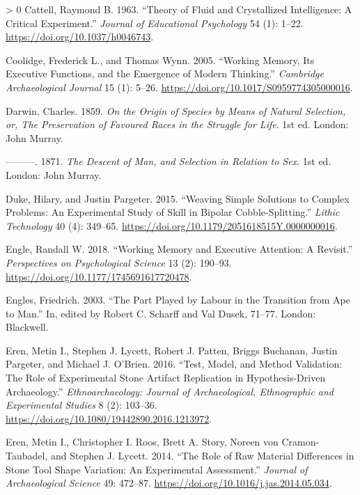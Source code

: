 \documentclass[smallextended]{svjour3}       %
\newlength{\cslhangindent}
\newenvironment{CSLReferences}[3] %
 {%
  \setlength{\parindent}{0pt}
  \ifodd #1 \everypar{\setlength{\hangindent}{\cslhangindent}}\ignorespaces\fi
  \ifnum #2 > 0
  \setlength{\parskip}{#3\baselineskip}
  \fi
 }%
 {}
\begin{document}
\begin{CSLReferences}{1}{0}
\leavevmode\hypertarget{ref-cattell1963}{}%
Cattell, Raymond B. 1963. {``Theory of Fluid and Crystallized
Intelligence: A Critical Experiment.''} \emph{Journal of Educational
Psychology} 54 (1): 1--22. \url{https://doi.org/10.1037/h0046743}.

\leavevmode\hypertarget{ref-coolidge2005}{}%
Coolidge, Frederick L., and Thomas Wynn. 2005. {``Working Memory, Its
Executive Functions, and the Emergence of Modern Thinking.''}
\emph{Cambridge Archaeological Journal} 15 (1): 5--26.
\url{https://doi.org/10.1017/S0959774305000016}.

\leavevmode\hypertarget{ref-darwin1859}{}%
Darwin, Charles. 1859. \emph{On the Origin of Species by Means of
Natural Selection, or, The Preservation of Favoured Races in the
Struggle for Life}. 1st ed. London: John Murray.

\leavevmode\hypertarget{ref-darwin1871}{}%
---------. 1871. \emph{The Descent of Man, and Selection in Relation to
Sex}. 1st ed. London: John Murray.

\leavevmode\hypertarget{ref-duke2015}{}%
Duke, Hilary, and Justin Pargeter. 2015. {``Weaving Simple Solutions to
Complex Problems: An Experimental Study of Skill in Bipolar
Cobble-Splitting.''} \emph{Lithic Technology} 40 (4): 349--65.
\url{https://doi.org/10.1179/2051618515Y.0000000016}.

\leavevmode\hypertarget{ref-engle2018}{}%
Engle, Randall W. 2018. {``Working Memory and Executive Attention: A
Revisit.''} \emph{Perspectives on Psychological Science} 13 (2):
190--93. \url{https://doi.org/10.1177/1745691617720478}.

\leavevmode\hypertarget{ref-engles2003}{}%
Engles, Friedrich. 2003. {``The Part Played by Labour in the Transition
from Ape to Man.''} In, edited by Robert C. Scharff and Val Dusek,
71--77. London: Blackwell.

\leavevmode\hypertarget{ref-eren2016}{}%
Eren, Metin I., Stephen J. Lycett, Robert J. Patten, Briggs Buchanan,
Justin Pargeter, and Michael J. O'Brien. 2016. {``Test, Model, and
Method Validation: The Role of Experimental Stone Artifact Replication
in Hypothesis-Driven Archaeology.''} \emph{Ethnoarchaeology: Journal of
Archaeological, Ethnographic and Experimental Studies} 8 (2): 103--36.
\url{https://doi.org/10.1080/19442890.2016.1213972}.

\leavevmode\hypertarget{ref-eren2014}{}%
Eren, Metin I., Christopher I. Roos, Brett A. Story, Noreen von
Cramon-Taubadel, and Stephen J. Lycett. 2014. {``The Role of Raw
Material Differences in Stone Tool Shape Variation: An Experimental
Assessment.''} \emph{Journal of Archaeological Science} 49: 472--87.
\url{https://doi.org/10.1016/j.jas.2014.05.034}.


\end{CSLReferences}
\end{document}
